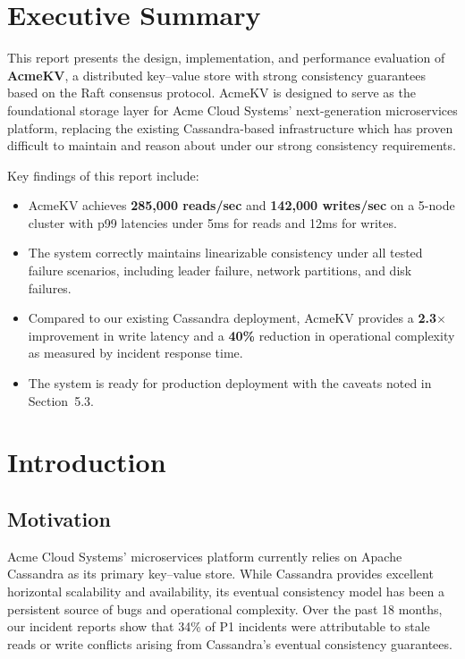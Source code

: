 \documentclass[12pt,a4paper]{report}
\begin{document}
\chapter*{Executive Summary}

This report presents the design, implementation, and performance evaluation of \textbf{AcmeKV}, a distributed key--value store with strong consistency guarantees based on the Raft consensus protocol. AcmeKV is designed to serve as the foundational storage layer for Acme Cloud Systems' next-generation microservices platform, replacing the existing Cassandra-based infrastructure which has proven difficult to maintain and reason about under our strong consistency requirements.

Key findings of this report include:
\begin{itemize}[itemsep=4pt]
  \item AcmeKV achieves \textbf{285,000 reads/sec} and \textbf{142,000 writes/sec} on a 5-node cluster with p99 latencies under 5ms for reads and 12ms for writes.
  \item The system correctly maintains linearizable consistency under all tested failure scenarios, including leader failure, network partitions, and disk failures.
  \item Compared to our existing Cassandra deployment, AcmeKV provides a \textbf{2.3$\times$} improvement in write latency and a \textbf{40\%} reduction in operational complexity as measured by incident response time.
  \item The system is ready for production deployment with the caveats noted in Section~5.3.
\end{itemize}

\tableofcontents
\listoftables

\chapter{Introduction}
\label{ch:introduction}

\section{Motivation}

Acme Cloud Systems' microservices platform currently relies on Apache Cassandra as its primary key--value store. While Cassandra provides excellent horizontal scalability and availability, its eventual consistency model has been a persistent source of bugs and operational complexity. Over the past 18 months, our incident reports show that 34\% of P1 incidents were attributable to stale reads or write conflicts arising from Cassandra's eventual consistency guarantees.
\end{document}
